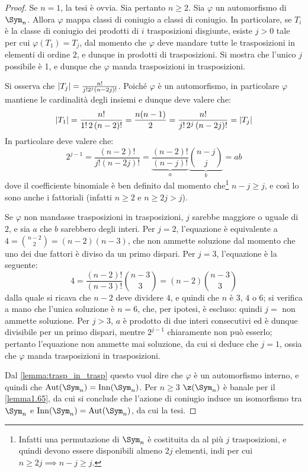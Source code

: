 \documentclass[11pt]{scrartcl}
\begin{document}
	\begin{proof}
		Se $n = 1$, la tesi è ovvia. Sia pertanto $n \geq 2$.
		Sia $\varphi$ un automorfismo di $\Sym_n$. Allora $\varphi$ mappa classi di coniugio
		a classi di coniugio. In particolare, se $T_i$ è la classe di coniugio dei prodotti di $i$ trasposizioni
		disgiunte,
		esiste $j > 0$ tale per cui $\varphi(T_1) = T_j$, dal momento che $\varphi$ deve mandare tutte le trasposizioni in elementi di ordine $2$, e dunque in prodotti di trasposizioni.
		Si mostra che l'unico $j$ possibile
		è 1, e dunque che $\varphi$ manda trasposizioni in trasposizioni. \medskip
		
		
		Si osserva che $\left\lvert T_j \right\rvert = \frac{n!}{j! 2^j (n-2j)!}$.
		Poiché $\varphi$ è un automorfismo, in particolare $\varphi$ mantiene le cardinalità degli
		insiemi e dunque deve valere che:
		\[ \left\lvert T_1 \right\rvert = \frac{n!}{1! \, 2 \, (n-2)!} = \frac{n(n-1)}{2} = \frac{n!}{j! \, 2^j \, (n-2j)!} = \left\lvert T_j \right\rvert \]
		In particolare deve valere che:
		\[ 2^{j-1} = \frac{(n-2)!}{j! (n-2j)!} = \underbrace{\frac{(n-2)!}{(n-j)!}}_a \underbrace{\binom{n-j}{j}}_b = ab \]
		dove il coefficiente binomiale è ben definito dal momento che\footnote{
			Infatti una
			permutazione di $\Sym_n$ è costituita da al più $j$ trasposizioni, e quindi devono essere
			disponibili almeno $2j$ elementi, indi per cui $n \geq 2j \implies n-j \geq j$.
		} $n - j \geq j$, e così lo sono anche i fattoriali (infatti $n \geq 2$ e $n \geq 2j > j$).
		\medskip
		
		
		Se $\varphi$ non mandasse trasposizioni in trasposizioni, $j$ sarebbe maggiore o uguale di $2$,
		e sia $a$ che $b$ sarebbero degli interi. Per $j = 2$, l'equazione è equivalente
		a $4 = \binom{n-2}{2} = (n-2)(n-3)$, che non ammette soluzione dal momento che uno dei due
		fattori è diviso da un primo dispari. Per $j = 3$, l'equazione è la seguente:
		\[ 4 = \frac{(n-2)!}{(n-3)!} \binom{n-3}{3} = (n-2) \binom{n-3}{3} \]
		dalla quale si ricava che $n-2$ deve dividere $4$, e quindi che $n$ è $3$, $4$ o $6$; si
		verifica a mano che l'unica soluzione è $n = 6$, che, per ipotesi, è escluso: quindi $j = $
		non ammette soluzione. Per $j > 3$, $a$ è prodotto di due interi consecutivi ed è dunque
		divisibile per un primo dispari, mentre $2^{j-1}$ chiaramente non può esserlo; pertanto
		l'equazione non ammette mai soluzione, da cui si deduce che $j = 1$, ossia che
		$\varphi$ manda trasposizioni in trasposizioni. \medskip
		
		
		Dal \autoref{lemma:trasp_in_trasp} questo vuol dire che $\varphi$ è un automorfismo interno,
		e quindi che $\Aut(\Sym_n) = \Inn(\Sym_n)$. Per $n \geq 3$ $\z(\Sym_n)$ è banale per il \autoref{lemma1.65}, da cui si conclude che l'azione di coniugio induce un isomorfismo tra $\Sym_n$ e $\Inn(\Sym_n) = \Aut(\Sym_n)$,
		da cui la tesi.
	\end{proof}
	
\end{document}
